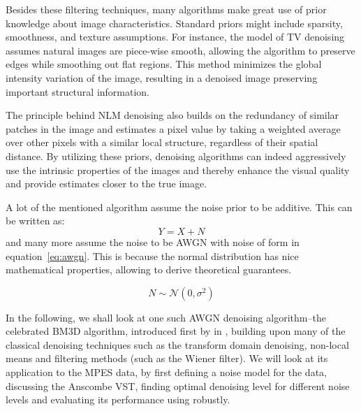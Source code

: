 Besides these filtering techniques, many algorithms make great use of prior knowledge about image characteristics. Standard priors might include sparsity, smoothness, and texture assumptions. For instance, the model of TV denoising assumes natural images are piece-wise smooth, allowing the algorithm to preserve edges while smoothing out flat regions. This method minimizes the global intensity variation of the image, resulting in a denoised image preserving important structural information.

The principle behind \gls{NLM} denoising also builds on the redundancy of similar patches in the image and estimates a pixel value by taking a weighted average over other pixels with a similar local structure, regardless of their spatial distance. By utilizing these priors, denoising algorithms can indeed aggressively use the intrinsic properties of the images and thereby enhance the visual quality and provide estimates closer to the true image.

A lot of the mentioned algorithm assume the noise prior to be additive. This can be written as:
\begin{equation}
    Y = X + N
\end{equation}
and many more assume the noise to be \gls{AWGN} with noise of form in equation~\ref{eq:awgn}. This is because the normal distribution has nice mathematical properties, allowing to derive theoretical guarantees.

\begin{equation}\label{eq:awgn}
    N \sim \mathcal{N}(0, \sigma^2)
\end{equation}

In the following, we shall look at one such \gls{AWGN} denoising algorithm--the celebrated \gls{BM3D} algorithm, introduced first by \citeauthor{dabovImageDenoisingSparse2007} in \cite{dabovImageDenoisingSparse2007}, building upon many of the classical denoising techniques such as the transform domain denoising, non-local means and filtering methods (such as the Wiener filter). We will look at its application to the \gls{MPES} data, by first defining a noise model for the data, discussing the Anscombe \gls{VST}, finding optimal denoising level for different noise levels and evaluating its performance using robustly.

